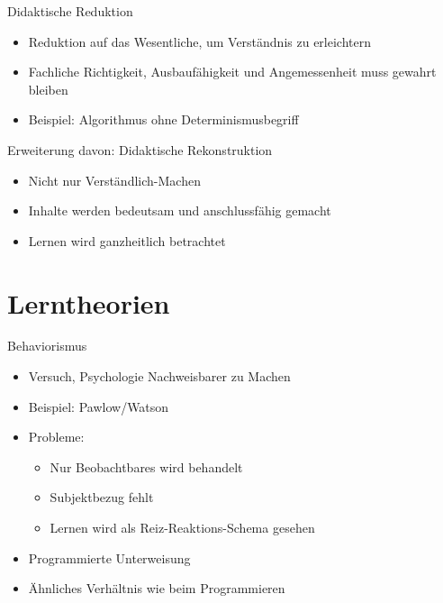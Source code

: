 \documentclass{article}
\begin{document}
\begin{block}{Didaktische Reduktion}
    \begin{itemize}
        \item Reduktion auf das Wesentliche, um Verständnis zu erleichtern
        \item Fachliche Richtigkeit, Ausbaufähigkeit und Angemessenheit muss gewahrt bleiben
        \item Beispiel: Algorithmus ohne Determinismusbegriff
    \end{itemize}
\end{block}
Erweiterung davon: Didaktische Rekonstruktion
\begin{itemize}
    \item Nicht nur Verständlich-Machen
    \item Inhalte werden bedeutsam und anschlussfähig gemacht
    \item Lernen wird ganzheitlich betrachtet
\end{itemize}

\section{Lerntheorien}
\begin{block}{Behaviorismus}
    \begin{itemize}
        \item Versuch, Psychologie Nachweisbarer zu Machen
        \item Beispiel: Pawlow/Watson
        \item Probleme:
        \begin{itemize}
            \item Nur Beobachtbares wird behandelt
            \item Subjektbezug fehlt
            \item Lernen wird als Reiz-Reaktions-Schema gesehen
        \end{itemize}
        \item Programmierte Unterweisung
        \item Ähnliches Verhältnis wie beim Programmieren
    \end{itemize}
\end{block}
\end{document}
